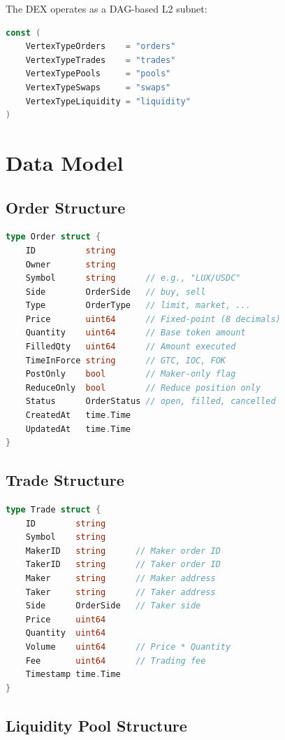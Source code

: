 \documentclass[11pt,twocolumn]{article}
\begin{document}
The DEX operates as a DAG-based L2 subnet:

\begin{lstlisting}[language=Go,caption={DEX vertex types}]
const (
    VertexTypeOrders    = "orders"
    VertexTypeTrades    = "trades"
    VertexTypePools     = "pools"
    VertexTypeSwaps     = "swaps"
    VertexTypeLiquidity = "liquidity"
)
\end{lstlisting}

\section{Data Model}

\subsection{Order Structure}

\begin{lstlisting}[language=Go,caption={Order representation}]
type Order struct {
    ID          string
    Owner       string
    Symbol      string      // e.g., "LUX/USDC"
    Side        OrderSide   // buy, sell
    Type        OrderType   // limit, market, ...
    Price       uint64      // Fixed-point (8 decimals)
    Quantity    uint64      // Base token amount
    FilledQty   uint64      // Amount executed
    TimeInForce string      // GTC, IOC, FOK
    PostOnly    bool        // Maker-only flag
    ReduceOnly  bool        // Reduce position only
    Status      OrderStatus // open, filled, cancelled
    CreatedAt   time.Time
    UpdatedAt   time.Time
}
\end{lstlisting}

\subsection{Trade Structure}

\begin{lstlisting}[language=Go,caption={Trade representation}]
type Trade struct {
    ID        string
    Symbol    string
    MakerID   string      // Maker order ID
    TakerID   string      // Taker order ID
    Maker     string      // Maker address
    Taker     string      // Taker address
    Side      OrderSide   // Taker side
    Price     uint64
    Quantity  uint64
    Volume    uint64      // Price * Quantity
    Fee       uint64      // Trading fee
    Timestamp time.Time
}
\end{lstlisting}

\subsection{Liquidity Pool Structure}
\end{document}
